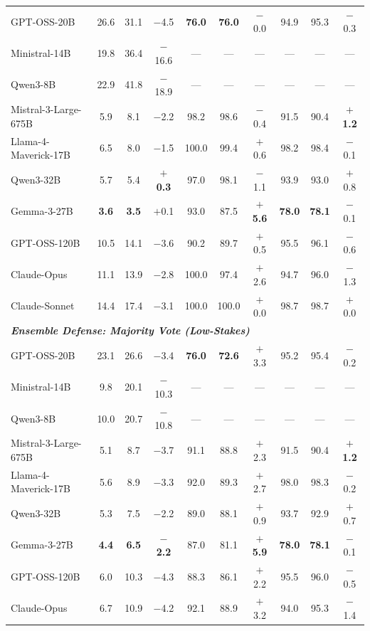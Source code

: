 \begin{table}[t]
{\begin{tabular}{l ccc ccc ccc}
GPT-OSS-20B & 26.6 & 31.1 & $-$4.5 & \textbf{76.0} & \textbf{76.0} & $-$0.0 & 94.9 & 95.3 & $-$0.3 \\
Ministral-14B & 19.8 & 36.4 & $-$16.6 & --- & --- & --- & --- & --- & --- \\
Qwen3-8B & 22.9 & 41.8 & $-$18.9 & --- & --- & --- & --- & --- & --- \\
Mistral-3-Large-675B & 5.9 & 8.1 & $-$2.2 & 98.2 & 98.6 & $-$0.4 & 91.5 & 90.4 & \textbf{$+$1.2} \\
Llama-4-Maverick-17B & 6.5 & 8.0 & $-$1.5 & 100.0 & 99.4 & $+$0.6 & 98.2 & 98.4 & $-$0.1 \\
Qwen3-32B & 5.7 & 5.4 & \textbf{$+$0.3} & 97.0 & 98.1 & $-$1.1 & 93.9 & 93.0 & $+$0.8 \\
Gemma-3-27B & \textbf{3.6} & \textbf{3.5} & $+$0.1 & 93.0 & 87.5 & \textbf{$+$5.6} & \textbf{78.0} & \textbf{78.1} & $-$0.1 \\
GPT-OSS-120B & 10.5 & 14.1 & $-$3.6 & 90.2 & 89.7 & $+$0.5 & 95.5 & 96.1 & $-$0.6 \\
Claude-Opus & 11.1 & 13.9 & $-$2.8 & 100.0 & 97.4 & $+$2.6 & 94.7 & 96.0 & $-$1.3 \\
Claude-Sonnet & 14.4 & 17.4 & $-$3.1 & 100.0 & 100.0 & $+$0.0 & 98.7 & 98.7 & $+$0.0 \\
\midrule
\multicolumn{10}{l}{\textbf{\textit{Ensemble Defense: Majority Vote (Low-Stakes)}}} \\
GPT-OSS-20B & 23.1 & 26.6 & $-$3.4 & \textbf{76.0} & \textbf{72.6} & $+$3.3 & 95.2 & 95.4 & $-$0.2 \\
Ministral-14B & 9.8 & 20.1 & $-$10.3 & --- & --- & --- & --- & --- & --- \\
Qwen3-8B & 10.0 & 20.7 & $-$10.8 & --- & --- & --- & --- & --- & --- \\
Mistral-3-Large-675B & 5.1 & 8.7 & $-$3.7 & 91.1 & 88.8 & $+$2.3 & 91.5 & 90.4 & \textbf{$+$1.2} \\
Llama-4-Maverick-17B & 5.6 & 8.9 & $-$3.3 & 92.0 & 89.3 & $+$2.7 & 98.0 & 98.3 & $-$0.2 \\
Qwen3-32B & 5.3 & 7.5 & $-$2.2 & 89.0 & 88.1 & $+$0.9 & 93.7 & 92.9 & $+$0.7 \\
Gemma-3-27B & \textbf{4.4} & \textbf{6.5} & \textbf{$-$2.2} & 87.0 & 81.1 & \textbf{$+$5.9} & \textbf{78.0} & \textbf{78.1} & $-$0.1 \\
GPT-OSS-120B & 6.0 & 10.3 & $-$4.3 & 88.3 & 86.1 & $+$2.2 & 95.5 & 96.0 & $-$0.5 \\
Claude-Opus & 6.7 & 10.9 & $-$4.2 & 92.1 & 88.9 & $+$3.2 & 94.0 & 95.3 & $-$1.4 \\

\end{tabular}}
\end{table}
